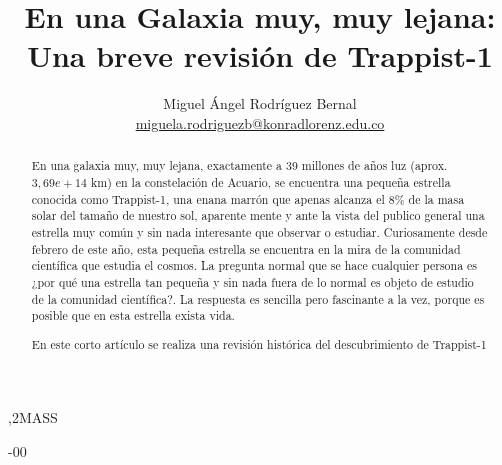 \documentclass[3p,times]{elsarticle}
\begin{document}
\begin{frontmatter}



\title{En una Galaxia muy, muy lejana: \\Una breve revisión de Trappist-1}


\author{Miguel Ángel Rodríguez Bernal\\ \href{mailto:miguela.rodriguezb@konradlorenz.edu.co}{miguela.rodriguezb@konradlorenz.edu.co} }

\address{Fundación Universitaria Konrad Lorenz \\ Bogotá, CO.}
\begin{abstract}
En una galaxia muy, muy lejana, exactamente a 39 millones de años luz (aprox. $3,69e+14$ km) en la constelación de Acuario, se encuentra una pequeña estrella conocida como Trappist-1, una enana marrón  que apenas alcanza el  $8\%$ de la masa solar del tamaño de nuestro sol, aparente mente y ante la vista del publico general una estrella muy común y sin nada interesante que observar o estudiar.  Curiosamente desde febrero de este año, esta pequeña estrella se encuentra en la mira de la comunidad científica que estudia el cosmos. La pregunta normal que se hace cualquier persona es ¿por qué una estrella tan pequeña y sin nada fuera de lo normal es objeto de estudio de la comunidad científica?. La respuesta es sencilla pero fascinante a la vez, porque es posible que en esta estrella exista vida.

En este corto artículo se realiza una revisión histórica del descubrimiento de Trappist-1 
\end{abstract}


\begin{keyword}
\sep 2MASS

-00 

\end{keyword}

\end{frontmatter}
\end{document}
